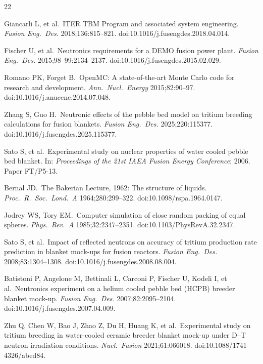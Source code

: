 \documentclass[preprint,12pt]{elsarticle}
\begin{document}
\begin{thebibliography}{22}

Giancarli L, et al.\ ITER TBM Program and associated system engineering.
\textit{Fusion Eng.\ Des.} 2018;136:815--821.
doi:10.1016/j.fusengdes.2018.04.014.

Fischer U, et al.\ Neutronics requirements for a DEMO fusion power plant.
\textit{Fusion Eng.\ Des.} 2015;98--99:2134--2137.
doi:10.1016/j.fusengdes.2015.02.029.

Romano PK, Forget B.\ OpenMC: A state-of-the-art Monte Carlo code for research
and development. \textit{Ann.\ Nucl.\ Energy} 2015;82:90--97.
doi:10.1016/j.anucene.2014.07.048.

Zhang S, Guo H.\ Neutronic effects of the pebble bed model on tritium breeding
calculations for fusion blankets. \textit{Fusion Eng.\ Des.} 2025;220:115377.
doi:10.1016/j.fusengdes.2025.115377.

Sato S, et al.\ Experimental study on nuclear properties of water cooled pebble
bed blanket. In: \textit{Proceedings of the 21st IAEA Fusion Energy
Conference}; 2006. Paper FT/P5-13.

Bernal JD.\ The Bakerian Lecture, 1962: The structure of liquids.
\textit{Proc.\ R.\ Soc.\ Lond.\ A} 1964;280:299--322.
doi:10.1098/rspa.1964.0147.

Jodrey WS, Tory EM.\ Computer simulation of close random packing of equal
spheres. \textit{Phys.\ Rev.\ A} 1985;32:2347--2351.
doi:10.1103/PhysRevA.32.2347.

Sato S, et al.\ Impact of reflected neutrons on accuracy of tritium production
rate prediction in blanket mock-ups for fusion reactors.
\textit{Fusion Eng.\ Des.} 2008;83:1304--1308.
doi:10.1016/j.fusengdes.2008.08.004.

Batistoni P, Angelone M, Bettinali L, Carconi P, Fischer U, Kodeli I, et al.\
Neutronics experiment on a helium cooled pebble bed (HCPB) breeder blanket
mock-up. \textit{Fusion Eng.\ Des.} 2007;82:2095--2104.
doi:10.1016/j.fusengdes.2007.04.009.

Zhu Q, Chen W, Bao J, Zhao Z, Du H, Huang K, et al.\ Experimental study on
tritium breeding in water-cooled ceramic breeder blanket mock-up under D--T
neutron irradiation conditions. \textit{Nucl.\ Fusion} 2021;61:066018.
doi:10.1088/1741-4326/abed84.


\end{thebibliography}
\end{document}

